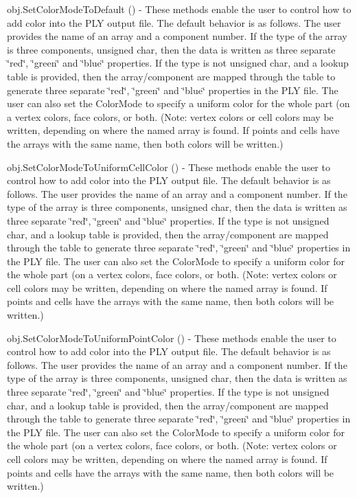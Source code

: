 \begin{DoxyItemize}
\item {\ttfamily obj.\-Set\-Color\-Mode\-To\-Default ()} -\/ These methods enable the user to control how to add color into the P\-L\-Y output file. The default behavior is as follows. The user provides the name of an array and a component number. If the type of the array is three components, unsigned char, then the data is written as three separate \char`\"{}red\char`\"{}, \char`\"{}green\char`\"{} and \char`\"{}blue\char`\"{} properties. If the type is not unsigned char, and a lookup table is provided, then the array/component are mapped through the table to generate three separate \char`\"{}red\char`\"{}, \char`\"{}green\char`\"{} and \char`\"{}blue\char`\"{} properties in the P\-L\-Y file. The user can also set the Color\-Mode to specify a uniform color for the whole part (on a vertex colors, face colors, or both. (Note\-: vertex colors or cell colors may be written, depending on where the named array is found. If points and cells have the arrays with the same name, then both colors will be written.)  
\item {\ttfamily obj.\-Set\-Color\-Mode\-To\-Uniform\-Cell\-Color ()} -\/ These methods enable the user to control how to add color into the P\-L\-Y output file. The default behavior is as follows. The user provides the name of an array and a component number. If the type of the array is three components, unsigned char, then the data is written as three separate \char`\"{}red\char`\"{}, \char`\"{}green\char`\"{} and \char`\"{}blue\char`\"{} properties. If the type is not unsigned char, and a lookup table is provided, then the array/component are mapped through the table to generate three separate \char`\"{}red\char`\"{}, \char`\"{}green\char`\"{} and \char`\"{}blue\char`\"{} properties in the P\-L\-Y file. The user can also set the Color\-Mode to specify a uniform color for the whole part (on a vertex colors, face colors, or both. (Note\-: vertex colors or cell colors may be written, depending on where the named array is found. If points and cells have the arrays with the same name, then both colors will be written.)  
\item {\ttfamily obj.\-Set\-Color\-Mode\-To\-Uniform\-Point\-Color ()} -\/ These methods enable the user to control how to add color into the P\-L\-Y output file. The default behavior is as follows. The user provides the name of an array and a component number. If the type of the array is three components, unsigned char, then the data is written as three separate \char`\"{}red\char`\"{}, \char`\"{}green\char`\"{} and \char`\"{}blue\char`\"{} properties. If the type is not unsigned char, and a lookup table is provided, then the array/component are mapped through the table to generate three separate \char`\"{}red\char`\"{}, \char`\"{}green\char`\"{} and \char`\"{}blue\char`\"{} properties in the P\-L\-Y file. The user can also set the Color\-Mode to specify a uniform color for the whole part (on a vertex colors, face colors, or both. (Note\-: vertex colors or cell colors may be written, depending on where the named array is found. If points and cells have the arrays with the same name, then both colors will be written.)  

\end{DoxyItemize}
